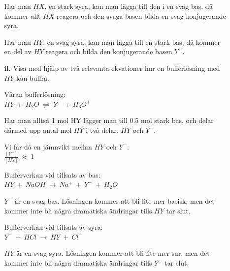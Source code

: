 \documentclass[12pt, letterpaper, twoside]{article}
\begin{document}
\begin{flushleft}
\begin{itemize}
\begin{itemize}
\hfill

Har man $ HX $, en stark syra, kan man lägga till den i en svag bas, då kommer allt $ HX $
reagera och den svaga basen bilda en svag konjugerande syra.

\hfill

Har man $ HY $, en svag syra, kan man lägga till en stark bas, då kommer en del av $ HY $
reagera och bilda den konjugerande basen $ Y^- $.

\hfill

\item[\textbf{ii.}]
Visa med hjälp av två relevanta ekvationer hur en bufferlösning med $ HY $ kan buffra.

\hfill

Våran bufferlösning: \\
$ HY\ +\ H_2O\ \rightleftharpoons\ Y^-\ +\ H_3O^+ $

\hfill

Har man alltså 1 mol HY lägger man till 0.5 mol stark bas, och delar därmed upp antal mol $ HY $
i två delar, $ HY $ och $ Y^- $.

Vi får då en jämnvikt mellan $ HY $ och $ Y^- $: \\
$ \frac{[Y^-]}{[HY]}\ \approx\ 1 $

\hfill

Bufferverkan vid tillsats av bas: \\
$ HY\ +\ NaOH\ \rightarrow\ Na^+\ +\ Y^-\ +\ H_2O $

$ Y^- $ är en svag bas. Lösningen kommer att bli lite mer basisk, men det kommer inte bli
några dramatiska ändringar tills $ HY $ tar slut.

\hfill

Bufferverkan vid tillsats av syra: \\
$ Y^-\ +\ HCl\ \rightarrow\ HY\ +\ Cl^- $

$ HY $ är en svag syra. Lösningen kommer att bli lite mer sur, men det kommer inte bli
några dramatiska ändringar tills $ Y^- $ tar slut.

\end{itemize}
\end{itemize}
\end{flushleft}



\end{document}
